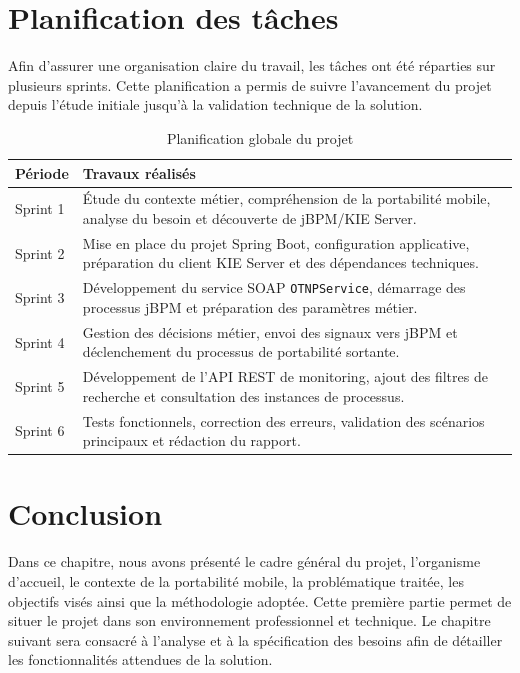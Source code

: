 \documentclass[12pt,a4paper]{report}
\begin{document}
\section{Planification des tâches}
Afin d'assurer une organisation claire du travail, les tâches ont été réparties sur plusieurs sprints. Cette planification a permis de suivre l'avancement du projet depuis l'étude initiale jusqu'à la validation technique de la solution.

\begin{table}[h]
    \centering
    \begin{tabular}{p{4cm}p{9cm}}
        \toprule
        \textbf{Période} & \textbf{Travaux réalisés} \\
        \midrule
        Sprint 1 & Étude du contexte métier, compréhension de la portabilité mobile, analyse du besoin et découverte de jBPM/KIE Server. \\
        Sprint 2 & Mise en place du projet Spring Boot, configuration applicative, préparation du client KIE Server et des dépendances techniques. \\
        Sprint 3 & Développement du service SOAP \texttt{OTNPService}, démarrage des processus jBPM et préparation des paramètres métier. \\
        Sprint 4 & Gestion des décisions métier, envoi des signaux vers jBPM et déclenchement du processus de portabilité sortante. \\
        Sprint 5 & Développement de l'API REST de monitoring, ajout des filtres de recherche et consultation des instances de processus. \\
        Sprint 6 & Tests fonctionnels, correction des erreurs, validation des scénarios principaux et rédaction du rapport. \\
        \bottomrule
    \end{tabular}
    \caption{Planification globale du projet}
\end{table}

\section*{Conclusion}
Dans ce chapitre, nous avons présenté le cadre général du projet, l'organisme d'accueil, le contexte de la portabilité mobile, la problématique traitée, les objectifs visés ainsi que la méthodologie adoptée. Cette première partie permet de situer le projet dans son environnement professionnel et technique. Le chapitre suivant sera consacré à l'analyse et à la spécification des besoins afin de détailler les fonctionnalités attendues de la solution.
\end{document}
